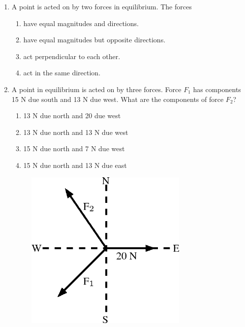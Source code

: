 \begin{enumerate}[noitemsep, label=\textbf{\arabic*}. ]
    \par
          \label{m38819*uid92}\item A point is acted on by two forces in equilibrium. The forces
\label{m38819*id197705}\begin{enumerate}[noitemsep, label=\textbf{\alph*}. ] 
            \label{m38819*uid93}\item have equal magnitudes and directions.
\label{m38819*uid94}\item have equal magnitudes but opposite directions.
\label{m38819*uid95}\item act perpendicular to each other.
\label{m38819*uid96}\item act in the same direction.
\end{enumerate}
                \label{m38819*uid97}\item A point in equilibrium is acted on by three forces. Force \begin{math}{F}_{1}\end{math} has components 15 N due south and 13 N due west. What are the components of force \begin{math}{F}_{2}\end{math}?
\label{m38819*id197809}\begin{enumerate}[noitemsep, label=\textbf{\alph*}. ] 
            \label{m38819*uid98}\item 13 N due north and 20 due west
\label{m38819*uid99}\item 13 N due north and 13 N due west
\label{m38819*uid100}\item 15 N due north and 7 N due west
\label{m38819*uid101}\item 15 N due north and 13 N due east
\end{enumerate}
        
    \setcounter{subfigure}{0}


	\begin{figure}[H] %
    \begin{center}
    \label{m38819*id197871!!!underscore!!!media}\label{m38819*id197871!!!underscore!!!printimage}\includegraphics[width=300px]{col11305.imgs/m38819_PG11C1_079.png} %
        

\end{center}
\end{figure}
\end{enumerate}
